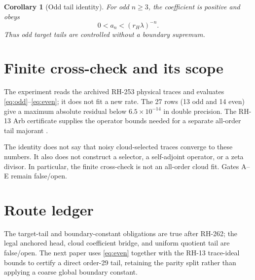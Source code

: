\documentclass[11pt]{article}
\newtheorem{corollary}[theorem]{Corollary}
\theoremstyle{remark}\newtheorem{remark}[theorem]{Remark}
\begin{document}
\begin{corollary}[Odd tail identity]
For odd $n\ge3$, the coefficient is positive and obeys
\[
 0<a_n<(r_H\lambda)^{-n}.
\]
Thus odd target tails are controlled without a boundary supremum.
\end{corollary}

\section{Finite cross-check and its scope}
The experiment reads the archived RH-253 physical traces and evaluates
\eqref{eq:odd}--\eqref{eq:even}; it does not fit a new rate.  The 27 rows
(13 odd and 14 even) give a maximum absolute residual below
$6.5\times10^{-14}$ in double precision.  The RH-13 Arb certificate supplies
the operator bounds needed for a separate all-order tail majorant
\citep{WangRH13}.

The identity does not say that noisy cloud-selected traces converge to these
numbers.  It also does not construct a selector, a self-adjoint operator, or
a zeta divisor.  In particular, the finite cross-check is not an all-order
cloud fit.  Gates A--E remain false/open.

\section{Route ledger}
The target-tail and boundary-constant obligations are true after RH-262;
the legal anchored head, cloud coefficient bridge, and uniform quotient tail
are false/open.  The next paper uses \eqref{eq:even} together with the
RH-13 trace-ideal bounds to certify a direct order-29 tail, retaining the
parity split rather than applying a coarse global boundary constant.


\end{document}
